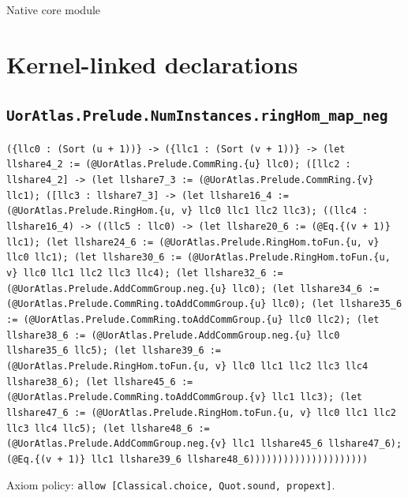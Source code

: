 \documentclass[11pt]{article}
\begin{document}
\begin{center}{\LARGE Native core module}\end{center}
\section*{Kernel-linked declarations}
\subsection*{\texttt{UorAtlas.Prelude.NumInstances.ringHom\_map\_neg}}
\noindent\texttt{(\{llc0 : (Sort (u + 1))\} -> (\{llc1 : (Sort (v + 1))\} -> (let llshare4\_2 := (@UorAtlas.Prelude.CommRing.\{u\} llc0); ([llc2 : llshare4\_2] -> (let llshare7\_3 := (@UorAtlas.Prelude.CommRing.\{v\} llc1); ([llc3 : llshare7\_3] -> (let llshare16\_4 := (@UorAtlas.Prelude.RingHom.\{u, v\} llc0 llc1 llc2 llc3); ((llc4 : llshare16\_4) -> ((llc5 : llc0) -> (let llshare20\_6 := (@Eq.\{(v + 1)\} llc1); (let llshare24\_6 := (@UorAtlas.Prelude.RingHom.toFun.\{u, v\} llc0 llc1); (let llshare30\_6 := (@UorAtlas.Prelude.RingHom.toFun.\{u, v\} llc0 llc1 llc2 llc3 llc4); (let llshare32\_6 := (@UorAtlas.Prelude.AddCommGroup.neg.\{u\} llc0); (let llshare34\_6 := (@UorAtlas.Prelude.CommRing.toAddCommGroup.\{u\} llc0); (let llshare35\_6 := (@UorAtlas.Prelude.CommRing.toAddCommGroup.\{u\} llc0 llc2); (let llshare38\_6 := (@UorAtlas.Prelude.AddCommGroup.neg.\{u\} llc0 llshare35\_6 llc5); (let llshare39\_6 := (@UorAtlas.Prelude.RingHom.toFun.\{u, v\} llc0 llc1 llc2 llc3 llc4 llshare38\_6); (let llshare45\_6 := (@UorAtlas.Prelude.CommRing.toAddCommGroup.\{v\} llc1 llc3); (let llshare47\_6 := (@UorAtlas.Prelude.RingHom.toFun.\{u, v\} llc0 llc1 llc2 llc3 llc4 llc5); (let llshare48\_6 := (@UorAtlas.Prelude.AddCommGroup.neg.\{v\} llc1 llshare45\_6 llshare47\_6); (@Eq.\{(v + 1)\} llc1 llshare39\_6 llshare48\_6)))))))))))))))))))))}\par
\noindent Axiom policy: \texttt{allow [Classical.choice, Quot.sound, propext]}.\par
\end{document}
